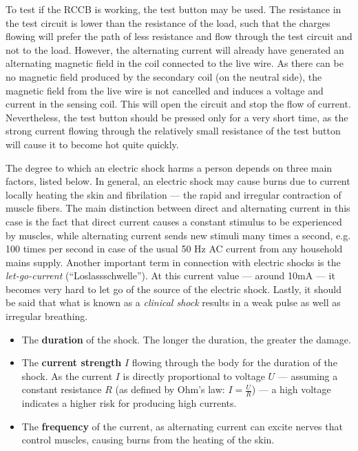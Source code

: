 To test if the RCCB is working, the test button may be used. The resistance in the test circuit is lower than the resistance of the load, such that the charges flowing will prefer the path of less resistance and flow through the test circuit and not to the load. However, the alternating current will already have generated an alternating magnetic field in the coil connected to the live wire. As there can be no magnetic field produced by the secondary coil (on the neutral side), the magnetic field from the live wire is not cancelled and induces a voltage and current in the sensing coil. This will open the circuit and stop the flow of current. Nevertheless, the test button should be pressed only for a very short time, as the strong current flowing through the relatively small resistance of the test button will cause it to become hot quite quickly.  


The degree to which an electric shock harms a person depends on three main factors, listed below. In general, an electric shock may cause burns due to current locally heating the skin and fibrilation --- the rapid and irregular contraction of muscle fibers. The main distinction between direct and alternating current in this case is the fact that direct current causes a constant stimulus to be experienced by muscles, while alternating current sends new stimuli many times a second, e.g. 100 times per second in case of the usual 50 Hz AC current from any household mains supply. Another important term in connection with electric shocks is the \emph{let-go-current} (``Loslassschwelle''). At this current value --- around 10mA --- it becomes very hard to let go of the source of the electric shock. Lastly, it should be said that what is known as a \emph{clinical shock} results in a weak pulse as well as irregular breathing.

\begin{itemize}

	\item The \textbf{duration} of the shock. The longer the duration, the greater the damage.

	\item The \textbf{current strength} $I$ flowing through the body for the duration of the shock. As the current $I$ is directly proportional to voltage $U$ --- assuming a constant resistance $R$ (as defined by Ohm's law: $I = \frac{U}{R}$) --- a high voltage indicates a higher risk for producing high currents.

	\item The \textbf{frequency} of the current, as alternating current can excite nerves that control muscles, causing burns from the heating of the skin. 
\end{itemize}

